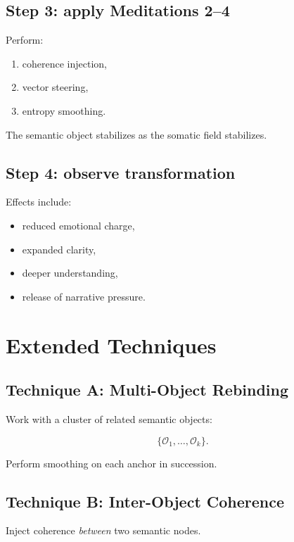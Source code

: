 \documentclass[12pt]{article}
\begin{document}
\subsection*{Step 3: apply Meditations 2--4}

Perform:

\begin{enumerate}
    \item coherence injection,
    \item vector steering,
    \item entropy smoothing.
\end{enumerate}

The semantic object stabilizes as the somatic field stabilizes.

\subsection*{Step 4: observe transformation}

Effects include:

\begin{itemize}
    \item reduced emotional charge,
    \item expanded clarity,
    \item deeper understanding,
    \item release of narrative pressure.
\end{itemize}

\section{Extended Techniques}

\subsection{Technique A: Multi-Object Rebinding}

Work with a cluster of related semantic objects:

\[
\{\mathcal{O}_1, \dots, \mathcal{O}_k\}.
\]

Perform smoothing on each anchor in succession.

\subsection{Technique B: Inter-Object Coherence}

Inject coherence \emph{between} two semantic nodes.
\end{document}
